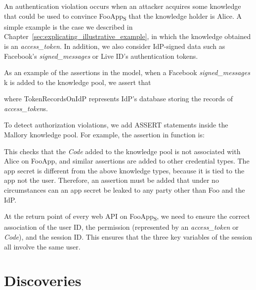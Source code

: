  An authentication violation occurs when an attacker acquires some knowledge that could be used to convince FooApp\textsubscript{S} that the knowledge holder is Alice.  A simple example is the case we described in Chapter~\ref{sec:explicating_illustrative_example}, in which the knowledge obtained is an \emph{access\_token}.  In addition, we also consider IdP-signed data such as Facebook's \emph{signed\_messages} or Live ID's authentication tokens.  

As an example of the assertions in the model, when a Facebook \emph{signed\_messages} k is added to the knowledge pool, we assert that


where TokenRecordsOnIdP represents IdP's database storing the records of \emph{access\_token}s.

 To detect authorization violations, we add ASSERT statements inside the Mallory knowledge pool.  For example, the assertion in function  is:


This checks that the \emph{Code} added to the knowledge pool is not associated with Alice on FooApp, and similar assertions are added to other credential types.  The app secret is different from the above knowledge types, because it is tied to the app not the user.  Therefore, an assertion must be added that under no circumstances can an app secret be leaked to any party other than Foo and the IdP.

 At the return point of every web API on FooApp\textsubscript{S}, we need to ensure the correct association of the user ID, the permission (represented by an \emph{access\_token} or \emph{Code}), and the session ID.  This ensures that the three key variables of the session all involve the same user.

\label{sec:explicating_semantic_modeling}


\section{Discoveries}
\label{sec:explicating_discoveries}
